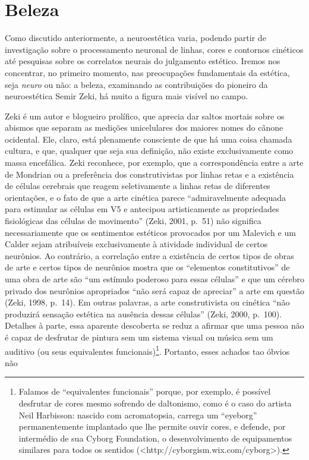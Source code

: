 \section{Beleza}

Como discutido anteriormente, a neuroestética varia, podendo partir de
investigação sobre o processamento neuronal de linhas, cores e contornos
cinéticos até pesquisas sobre os correlatos neurais do julgamento
estético. Iremos nos concentrar, no primeiro momento, nas preocupações
fundamentais da estética, seja \emph{neuro} ou não: a beleza, examinando
as contribuições do pioneiro da neuroestética Semir Zeki, há muito a
figura mais visível no campo.

Zeki é um autor e blogueiro prolífico, que aprecia dar saltos mortais
sobre os abismos que separam as medições unicelulares dos maiores nomes
do cânone ocidental. Ele, claro, está plenamente consciente de que há
uma coisa chamada cultura, e que, qualquer que seja sua definição, não
existe exclusivamente como massa encefálica. Zeki reconhece, por
exemplo, que a correspondência entre a arte de Mondrian ou a preferência
dos construtivistas por linhas retas e a existência de células cerebrais
que reagem seletivamente a linhas retas de diferentes orientações, e o
fato de que a arte cinética parece ``admiravelmente adequada para
estimular as células em V5 e antecipou artisticamente as propriedades
fisiológicas das células de movimento'' (Zeki, 2001, p.~51) não significa
necessariamente que os sentimentos estéticos provocados por um Malevich
e um Calder sejam atribuíveis exclusivamente à atividade individual de
certos neurônios. Ao contrário, a correlação entre a existência de
certos tipos de obras de arte e certos tipos de neurônios mostra que os
``elementos constitutivos'' de uma obra de arte são ``um estímulo
poderoso para essas células'' e que um cérebro privado dos neurônios
apropriados ``não será capaz de apreciar'' a arte em questão (Zeki,
1998, p.~14). Em outras palavras, a arte construtivista ou cinética ``não
produzirá sensação estética na ausência dessas células'' (Zeki, 2000,
p.~100). Detalhes à parte, essa aparente descoberta se reduz a afirmar
que uma pessoa não é capaz de desfrutar de pintura sem um sistema visual
ou música sem um auditivo (ou seus equivalentes
funcionais)\footnote[19]{Falamos de ``equivalentes funcionais'' porque, por exemplo, é
possível desfrutar de cores mesmo sofrendo de daltonismo, como é o caso
do artista Neil Harbisson: nascido com acromatopsia, carrega um
``eyeborg'' permanentemente implantado que lhe permite ouvir cores, e
defende, por intermédio de sua Cyborg Foundation, o desenvolvimento de
equipamentos similares para todos os sentidos
(\textless{}http://cyborgism.wix.com/cyborg\textgreater{}).}. Portanto, esses achados tao óbvios não
